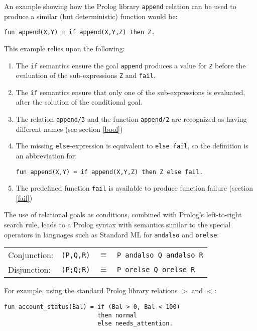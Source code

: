An example showing how the Prolog library \texttt{append} relation can
be used to produce a similar (but deterministic) function would be:
\begin{verbatim}
fun append(X,Y) = if append(X,Y,Z) then Z.
\end{verbatim}
This example relies upon the following:
\begin{enumerate}
\item{The \texttt{if} semantics ensure the goal \texttt{append} produces a
  value for \texttt{Z} before the evaluation of the sub-expressions
  \texttt{Z} and \texttt{fail}.}
\item{The \texttt{if} semantics ensure that
  only one of the sub-expressions is
  evaluated, after the
  solution of the conditional goal.}
\item{The relation \texttt{append/3} and the function \texttt{append/2} are recognized
  as having different names (see section \ref{bool})}
\item{The missing \texttt{else}-expression is equivalent to \texttt{else fail}, so the
  definition is an abbreviation for:\\
  \centerline{\texttt{fun append(X,Y) = if append(X,Y,Z) then Z else fail.}}
  }
\item{The predefined function \texttt{fail} is available to produce
  function failure (section \ref{fail})}
\end{enumerate}

The use of relational goals as conditions, combined with Prolog's left-to-right
search rule,
leads to a Prolog syntax with semantics similar to the special operators in languages
such as Standard ML for \texttt{andalso} and \texttt{orelse}:

\begin{tabular}{l l l l}
Conjunction: & \texttt{(P,Q,R)} & $\equiv$ & \texttt{P andalso Q andalso R}\\
Disjunction: & \texttt{(P;Q;R)} & $\equiv$ & \texttt{P orelse Q orelse R}
\end{tabular}

For example, using the standard Prolog library relations $>$ and $<$:
\begin{verbatim}
fun account_status(Bal) = if (Bal > 0, Bal < 100)
                          then normal
                          else needs_attention.
\end{verbatim}


